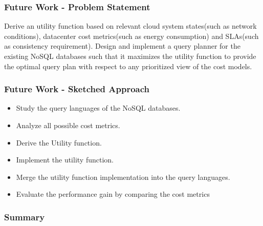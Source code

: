 \documentclass{beamer}
\begin{document}
\begin{frame}
  \frametitle{Future Work - Problem Statement}

  Derive an utility function based on relevant cloud system states(such as
  network conditions), datacenter cost metrics(such as energy consumption) and
  SLAs(such as consistency requirement). Design and implement a query planner
  for the existing NoSQL databases such that it maximizes the utility function
  to provide the optimal query plan with respect to any prioritized view of the
  cost models.

\end{frame}

\begin{frame}
  \frametitle{Future Work - Sketched Approach}
  \begin{itemize}
    \item Study the query languages of the NoSQL databases.
    \item Analyze all possible cost metrics.
    \item Derive the Utility function.
    \item Implement the utility function.
    \item Merge the utility function implementation into the query languages.
    \item Evaluate the performance gain by comparing the cost metrics
  \end{itemize}
\end{frame}

\begin{frame}
  \frametitle{Summary}
\end{frame}
\end{document}
